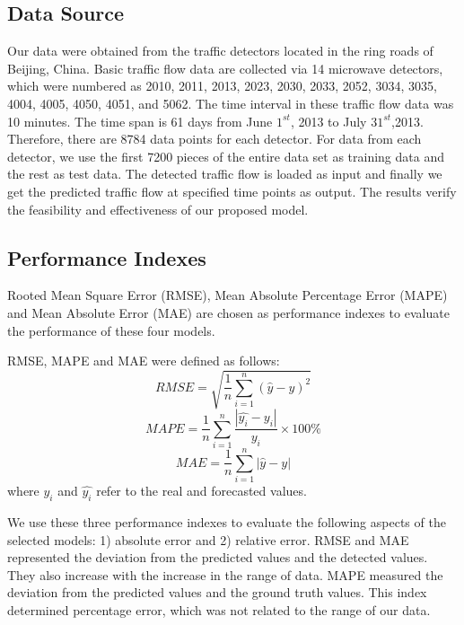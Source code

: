 \documentclass[twocolumn]{article}
\begin{document}
\subsection{Data Source}
Our data were obtained from the traffic detectors located in the ring roads of Beijing, China. Basic traffic flow data are collected via 14 microwave detectors, which were numbered as 2010, 2011, 2013, 2023, 2030, 2033, 2052, 3034, 3035, 4004, 4005, 4050, 4051, and 5062. The time interval in these traffic flow data was 10 minutes. 
 The time span is 61 days from June $1^{st}$, 2013 to July $31^{st}$,2013. Therefore, there are 8784 data points for each detector. For data from each detector, we use the first 7200 pieces of the entire data set as training data and the rest as test data. The detected traffic flow is loaded as input and finally we get the predicted traffic flow at specified time points as output. The results verify the feasibility and effectiveness of our proposed model.

\subsection{Performance Indexes}

\par 
Rooted Mean Square Error (RMSE), Mean Absolute Percentage Error (MAPE) and Mean Absolute Error (MAE) are chosen as performance indexes to evaluate the performance of these four models.
\par 
RMSE, MAPE and MAE were defined as follows:
\[
RMSE = \sqrt{\frac{1}{n}\sum_{i=1}^{n}(\hat{y}-y)^2}
\]
\[
MAPE = \frac{1}{n}\sum_{i = 1}^{n}\frac{|\hat{y_i} - y_i|}{y_i} \times 100\%
\]
\[
MAE = \frac{1}{n}\sum_{i=1}^n|\hat{y}-y|
\]
where $y_i$  and $\hat{y_i}$ refer to the real and forecasted values.
\par
We use these three performance indexes to evaluate the following aspects of the selected models: 1) absolute error and 2) relative error. RMSE and MAE represented the deviation from the predicted values and the detected values. They also increase with the increase in the range of data. MAPE measured the deviation from the predicted values and the ground truth values. This index determined percentage error, which was not related to the range of our data. 
\end{document}
